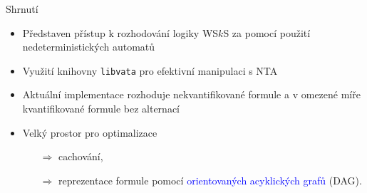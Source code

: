 \documentclass{beamer}
\begin{document}
  \begin{frame}{Shrnutí}
  \begin{itemize}
    \item Představen přístup k rozhodování logiky WS$k$S za pomocí použití
    nedeterministických automatů
      \pause
    \item Využití knihovny \texttt{libvata} pro efektivní manipulaci s NTA
      \pause
    \item Aktuální implementace rozhoduje nekvantifikované formule a v omezené
    míře kvantifikované formule bez alternací
      \pause
    \item Velký prostor pro optimalizace
    \begin{itemize}
      \item[$\Rightarrow$]cachování,
      \item[$\Rightarrow$]reprezentace formule pomocí
	    \textcolor{blue}{orientovaných acyklických grafů} (DAG).
    \end{itemize}
  \end{itemize}
  \end{frame}
\end{document}
